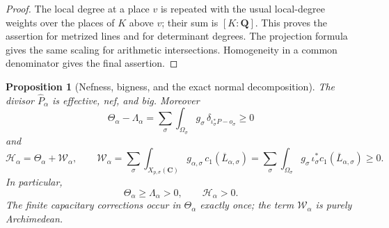 \documentclass[11pt]{article}
\newtheorem{proposition}[proposition]{Proposition}
\theoremstyle{definition}
\theoremstyle{remark}
\newcommand{\Q}{\mathbf Q}
\newcommand{\C}{\mathbf C}
\newcommand{\Energy}{\mathscr H}
\newcommand{\LambdaAH}{\Lambda}
\begin{document}
\begin{proof}
The local degree at a place $v$ is repeated with the usual local-degree
weights over the places of $K$ above $v$; their sum is $[K:\Q]$.  This proves
the assertion for metrized lines and for determinant degrees.  The projection
formula gives the same scaling for arithmetic intersections.  Homogeneity in
a common denominator gives the final assertion.
\end{proof}

\begin{proposition}[Nefness, bigness, and the exact normal decomposition]
\label{prop:exact-mixed-divisor}
The divisor $\widehat P_\alpha$ is effective, nef, and big.  Moreover
\begin{equation}\label{eq:theta-minus-lambda}
 \Theta_\alpha-\LambdaAH_\alpha
 =\sum_{\sigma}
   \int_{\Omega_\sigma}g_\sigma\,
   \delta_{\iota_\sigma^*P-o_\sigma}\ge0
\end{equation}
and
\begin{equation}\label{eq:energy-theta}
 \boxed{
 \Energy_\alpha=\Theta_\alpha+\mathscr W_\alpha,\qquad
 \mathscr W_\alpha=
 \sum_\sigma\int_{X_{p,\sigma}(\C)}
 g_{\alpha,\sigma}\,c_1(\overline L_{\alpha,\sigma})
 =\sum_\sigma\int_{\Omega_\sigma}
 g_\sigma\,\iota_\sigma^*c_1(\overline L_{\alpha,\sigma})\ge0.}
\end{equation}
In particular,
\[
 \Theta_\alpha\ge\LambdaAH_\alpha>0,
 \qquad
 \Energy_\alpha>0.
\]
The finite capacitary corrections occur in $\Theta_\alpha$ exactly once; the
term $\mathscr W_\alpha$ is purely Archimedean.
\end{proposition}
\end{document}
